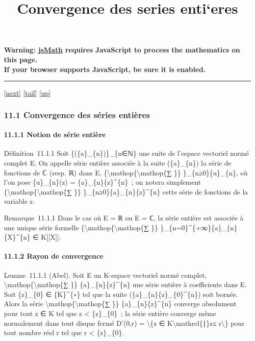 \documentclass[]{article}
\title{Convergence des series enti`eres}
\author{}
\date{}
\begin{document}
\maketitle

\textbf{Warning: \href{http://www.math.union.edu/locate/jsMath}{jsMath}
requires JavaScript to process the mathematics on this page.\\ If your
browser supports JavaScript, be sure it is enabled.}

\begin{center}\rule{3in}{0.4pt}\end{center}

{[}\href{coursse64.html}{next}{]}
{[}\hyperref[tailcoursse63.html]{tail}{]}
{[}\href{coursch12.html\#coursse63.html}{up}{]}

\subsubsection{11.1 Convergence des séries entières}

\paragraph{11.1.1 Notion de série entière}

Définition~11.1.1 Soit \{(\{a\}\_\{n\})\}\_\{n∈ℕ\} une suite de l'espace
vectoriel normé complet E. On appelle série entière associée à la suite
(\{a\}\_\{n\}) la série de fonctions de ℂ (resp. ℝ) dans E,
\{\textbackslash{}mathop\{\textbackslash{}mathop\{∑ \}\}
\}\_\{n≥0\}\{u\}\_\{n\}, où l'on pose \{u\}\_\{n\}(z) =
\{a\}\_\{n\}\{z\}\^{}\{n\}~; on notera simplement
\{\textbackslash{}mathop\{\textbackslash{}mathop\{∑ \}\}
\}\_\{n≥0\}\{a\}\_\{n\}\{z\}\^{}\{n\} cette série de fonctions de la
variable z.

Remarque~11.1.1 Dans le cas où E = ℝ ou E = ℂ, la série entière est
associée à une unique série formelle
\{\textbackslash{}mathop\{\textbackslash{}mathop\{∑ \}\}
\}\_\{n=0\}\^{}\{+∞\}\{a\}\_\{n\}\{X\}\^{}\{n\} ∈ K{[}{[}X{]}{]}.

\paragraph{11.1.2 Rayon de convergence}

Lemme~11.1.1 (Abel). Soit E un K-espace vectoriel normé complet,
\textbackslash{}mathop\{\textbackslash{}mathop\{∑ \}\}
\{a\}\_\{n\}\{z\}\^{}\{n\} une série entière à coefficients dans E. Soit
\{z\}\_\{0\} ∈ \{K\}\^{}\{∗\} tel que la suite
(\{a\}\_\{n\}\{z\}\_\{0\}\^{}\{n\}) soit bornée. Alors la série
\textbackslash{}mathop\{\textbackslash{}mathop\{∑ \}\}
\{a\}\_\{n\}\{z\}\^{}\{n\} converge absolument pour tout z ∈ K tel que
\textbar{}z\textbar{} \textless{} \textbar{}\{z\}\_\{0\}\textbar{}~; la
série entière converge même normalement dans tout disque fermé D'(0,r) =
\textbackslash{}\{z ∈
K\textbackslash{}mathrel\{∣\}\textbar{}z\textbar{}≤ r\textbackslash{}\}
pour tout nombre réel r tel que r \textless{}
\textbar{}\{z\}\_\{0\}\textbar{}.
\end{document}
